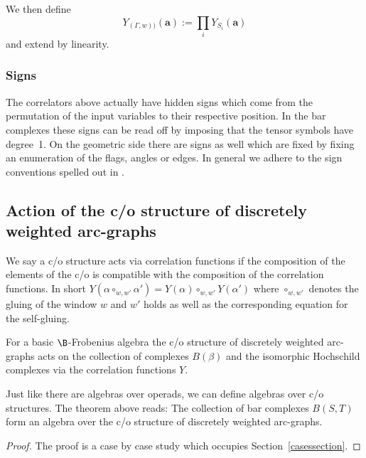 We then def\/ine{\samepage
\begin{equation}
\label{cordefgraph}
Y_{(\Gamma,w))}({\mathbf a}):=\prod_i Y_{S_i}({\mathbf a})
\end{equation}
and extend by linearity.}


\subsubsection{Signs} The correlators above actually have hidden signs which come
from the permutation of the input variables to their respective position. In the bar complexes these signs can be read of\/f by imposing that the tensor symbols have degree~1. On the geometric side
there are signs as well which are f\/ixed by f\/ixing an enumeration of the f\/lags, angles or edges.
In general we adhere to the sign conventions spelled out in \cite[Section 1.3.4]{hoch2}.




\subsection{Action of the c/o structure of discretely weighted arc-graphs}


We say a c/o structure acts via correlation functions if the
composition of the elements of the c/o is compatible with the
composition of the correlation functions. In short $Y(\alpha
\circ_{w,w'} \alpha')=Y(\alpha)  \circ_{w,w'} Y(\alpha')$ where
$\circ_{w,w'} $ denotes the gluing of the window $w$ and $w'$ holds
as well as the corresponding equation for the self-gluing.


\begin{thm}
\label{discretethm} For a basic  $\B$-Frobenius algebra the c/o
structure of discretely weighted arc-graphs acts  on  the
collection of complexes $B(\beta)$ and the isomorphic Hochschild
complexes via the correlation functions $Y$.
\end{thm}

Just like there are algebras over operads, we can def\/ine algebras
over c/o structures.  The theorem above reads: The collection of bar
complexes $B(S,T)$ form an algebra over the c/o structure of
discretely weighted arc-graphs.

\begin{proof}
The proof is a case by case study which occupies Section~\ref{casessection}.
\end{proof}



